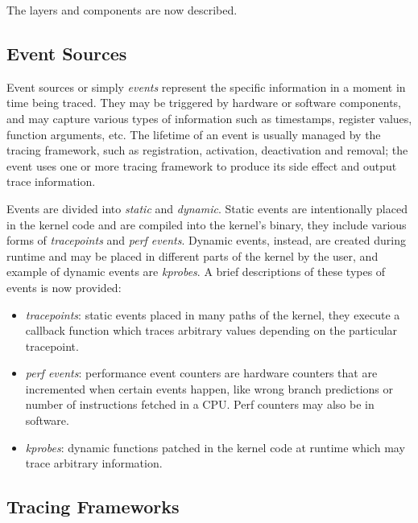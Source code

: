 

The layers and components are now described.

\subsection{Event Sources}

Event sources or simply \textit{events} represent the specific information in a
moment in time being traced. They may be triggered by hardware or software
components, and may capture various types of information such as timestamps,
register values, function arguments, etc. The lifetime of an event is usually
managed by the tracing framework, such as registration, activation, deactivation
and removal; the event uses one or more tracing framework to produce its side
effect and output trace information.

Events are divided into \textit{static} and \textit{dynamic}. Static events are
intentionally placed in the kernel code and are compiled into the kernel's
binary, they include various forms of \textit{tracepoints} and
\textit{perf events}. Dynamic events, instead, are created during runtime and
may be placed in different parts of the kernel by the user, and example of
dynamic events are \textit{kprobes}. A brief descriptions of these types of
events is now provided:

\begin{itemize}

  \item \textit{tracepoints}: static events placed in many paths of the kernel,
    they execute a callback function which traces arbitrary values depending on
    the particular tracepoint.

  \item \textit{perf events}: performance event counters are hardware counters
    that are incremented when certain events happen, like wrong branch
    predictions or number of instructions fetched in a CPU. Perf counters may
    also be in software.

  \item \textit{kprobes}: dynamic functions patched in the kernel code at
    runtime which may trace arbitrary information.

\end{itemize}

\subsection{Tracing Frameworks}

